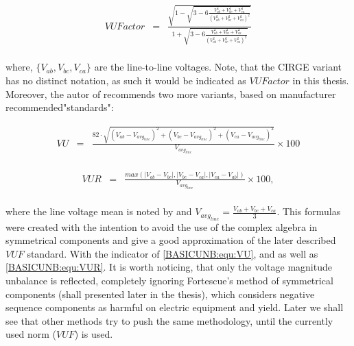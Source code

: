 	\begin{equation}
        \begin{array}{rcl}
            VUFactor&=&\frac{\sqrt{{1-\sqrt{3-6\frac{V_{ab}^4+V_{bc}^4+V_{ca}^4}{\left(V_{ab}^2+V_{bc}^2+V_{ca}^2\right)^2}}}}}{1+\sqrt{3-6\frac{V_{ab}^4+V_{bc}^4+V_{ca}^4}{\left(V_{ab}^2+V_{bc}^2+V_{ca}^2\right)^2}}}\\
        \end{array}
        \label{BASICUNB:equ:CIRGE}
    \end{equation}
		
		where, $\{V_{ab},V_{bc},V_{ca}\}$ are the line-to-line voltages. Note, that the CIRGE variant has no distinct notation, as such it would be indicated as $VUFactor$ in this thesis. Moreover, the autor of \cite{robert1992assessing} recommends two more variants, based on manufacturer recommended"standards": 
		
		\begin{equation}
        \begin{array}{rcl}
            VU&=&\frac{82\cdot\sqrt{(V_{ab}-V_{avg_{line}})^2+(V_{bc}-V_{avg_{line}})^2+(V_{ca}-V_{avg_{line}})^2}}{V_{avg_{line}}}\times100\\					
        \end{array}
        \label{BASICUNB:equ:VU}
    \end{equation}
		
		\begin{equation}
        \begin{array}{rcl}
            VUR&=&\frac{max\left( |V_{ab}-V_{bc}|,|V_{bc}-V_{ca}|,|V_{ca}-V_{ab}| \right)}{V_{avg_{line}}}\times100,\\				
        \end{array}
        \label{BASICUNB:equ:VUR}
    \end{equation}
		
		where the line voltage mean is noted by and $V_{avg_{line}}=\frac{V_{ab}+V_{bc}+V_{ca}}{3}$.
		This formulas were created with the intention to avoid the use of the complex algebra in symmetrical components and give
a good approximation of the later described $VUF$ standard. With the indicator of \ref{BASICUNB:equ:VU}, and as well as \ref{BASICUNB:equ:VUR}. It is worth noticing, that only the voltage magnitude unbalance is reflected, completely ignoring Fortescue's method of symmetrical components \cite{fortescue1918method} (shall presented later in the thesis), which considers negative sequence components as harmful on electric equipment and yield. Later we shall see that other methods try to push the same methodology, until the currently used norm ($VUF$) is used.

